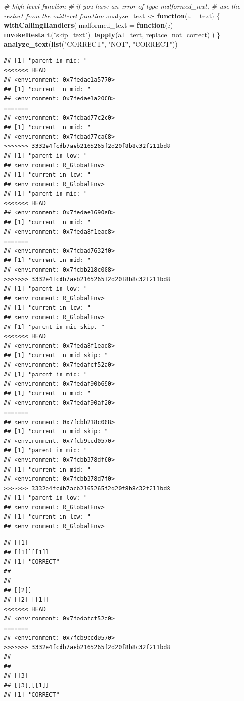 \documentclass[]{book}
\newenvironment{Shaded}{\begin{snugshade}}{\end{snugshade}}
\newcommand{\CommentTok}[1]{\textcolor[rgb]{0.56,0.35,0.01}{\textit{#1}}}
\newcommand{\ControlFlowTok}[1]{\textcolor[rgb]{0.13,0.29,0.53}{\textbf{#1}}}
\newcommand{\DataTypeTok}[1]{\textcolor[rgb]{0.13,0.29,0.53}{#1}}
\newcommand{\KeywordTok}[1]{\textcolor[rgb]{0.13,0.29,0.53}{\textbf{#1}}}
\newcommand{\NormalTok}[1]{#1}
\newcommand{\StringTok}[1]{\textcolor[rgb]{0.31,0.60,0.02}{#1}}
\begin{document}
\begin{Shaded}
\begin{Highlighting}[]
\CommentTok{# high level function}
\CommentTok{# if you have an error of type malformed_text, }
\CommentTok{# use the restart from the midlevel function}
\NormalTok{analyze_text <-}\StringTok{ }\ControlFlowTok{function}\NormalTok{(all_text) \{}
  \KeywordTok{withCallingHandlers}\NormalTok{(}
    \DataTypeTok{malformed_text =} \ControlFlowTok{function}\NormalTok{(e) }\KeywordTok{invokeRestart}\NormalTok{(}\StringTok{"skip_text"}\NormalTok{),}
    \KeywordTok{lapply}\NormalTok{(all_text, replace_not_correct)}
\NormalTok{  )}
\NormalTok{\}}
\KeywordTok{analyze_text}\NormalTok{(}\KeywordTok{list}\NormalTok{(}\StringTok{"CORRECT"}\NormalTok{, }\StringTok{"NOT"}\NormalTok{, }\StringTok{"CORRECT"}\NormalTok{))}
\end{Highlighting}
\end{Shaded}

\begin{verbatim}
## [1] "parent in mid: "
<<<<<<< HEAD
## <environment: 0x7fedae1a5770>
## [1] "current in mid: "
## <environment: 0x7fedae1a2008>
=======
## <environment: 0x7fcbad77c2c0>
## [1] "current in mid: "
## <environment: 0x7fcbad77ca68>
>>>>>>> 3332e4fcdb7aeb2165265f2d20f8b8c32f211bd8
## [1] "parent in low: "
## <environment: R_GlobalEnv>
## [1] "current in low: "
## <environment: R_GlobalEnv>
## [1] "parent in mid: "
<<<<<<< HEAD
## <environment: 0x7fedae1690a8>
## [1] "current in mid: "
## <environment: 0x7feda8f1ead8>
=======
## <environment: 0x7fcbad7632f0>
## [1] "current in mid: "
## <environment: 0x7fcbb218c008>
>>>>>>> 3332e4fcdb7aeb2165265f2d20f8b8c32f211bd8
## [1] "parent in low: "
## <environment: R_GlobalEnv>
## [1] "current in low: "
## <environment: R_GlobalEnv>
## [1] "parent in mid skip: "
<<<<<<< HEAD
## <environment: 0x7feda8f1ead8>
## [1] "current in mid skip: "
## <environment: 0x7fedafcf52a0>
## [1] "parent in mid: "
## <environment: 0x7fedaf90b690>
## [1] "current in mid: "
## <environment: 0x7fedaf90af20>
=======
## <environment: 0x7fcbb218c008>
## [1] "current in mid skip: "
## <environment: 0x7fcb9ccd0570>
## [1] "parent in mid: "
## <environment: 0x7fcbb378df60>
## [1] "current in mid: "
## <environment: 0x7fcbb378d7f0>
>>>>>>> 3332e4fcdb7aeb2165265f2d20f8b8c32f211bd8
## [1] "parent in low: "
## <environment: R_GlobalEnv>
## [1] "current in low: "
## <environment: R_GlobalEnv>
\end{verbatim}

\begin{verbatim}
## [[1]]
## [[1]][[1]]
## [1] "CORRECT"
## 
## 
## [[2]]
## [[2]][[1]]
<<<<<<< HEAD
## <environment: 0x7fedafcf52a0>
=======
## <environment: 0x7fcb9ccd0570>
>>>>>>> 3332e4fcdb7aeb2165265f2d20f8b8c32f211bd8
## 
## 
## [[3]]
## [[3]][[1]]
## [1] "CORRECT"
\end{verbatim}
\end{document}

